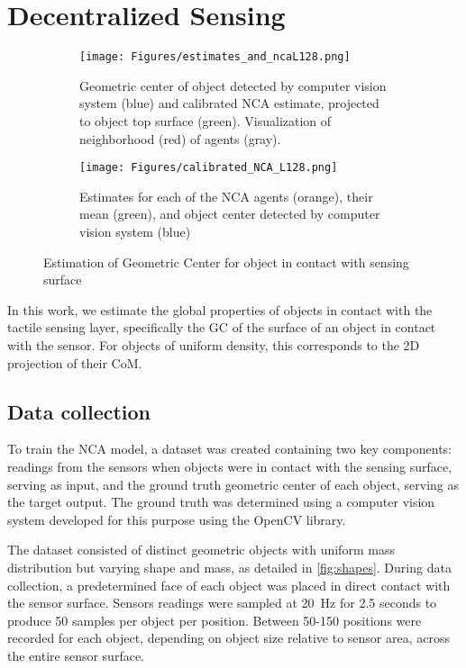 \section{Decentralized Sensing} %



\begin{figure*}[th]
\begin{subfigure}{0.5\textwidth}
\centering
\texttt{[image: Figures/estimates\_and\_ncaL128.png]}
\captionsetup{width=0.9\textwidth}
\caption{Geometric center of object detected by computer vision system (blue) and calibrated NCA estimate, projected to object top surface (green). Visualization of neighborhood (red) of agents (gray).}
\label{fig:estimate_projections}
\end{subfigure}
\begin{subfigure}{0.5\textwidth}
\centering
\texttt{[image: Figures/calibrated\_NCA\_L128.png]}
\captionsetup{width=0.9\textwidth}
\caption{Estimates for each of the NCA agents (orange), their mean (green), and object center detected by computer vision system (blue)\\
}
\label{fig:NCA_estimates}
\end{subfigure}

\caption{Estimation of Geometric Center for object in contact with sensing surface }
\label{fig:twin_image}
\end{figure*}

In this work, we estimate the global properties of objects in contact with the tactile sensing layer, specifically the \ac{GC} of the surface of an object in contact with the sensor. For objects of uniform density, this corresponds to the 2D projection of their \ac{CoM}.


\subsection{Data collection}

To train the \ac{NCA} model, a dataset was created containing two key components: readings from the sensors when objects were in contact with the sensing surface, serving as input, and the ground truth geometric center of each object, serving as the target output. The ground truth was determined using a computer vision system developed for this purpose using the OpenCV library\cite{bradski_opencv_2000}.


The dataset consisted of distinct geometric objects with uniform mass distribution but varying shape and mass, as detailed in \cref{fig:shapes}. During data collection, a predetermined face of each object was placed in direct contact with the sensor surface. Sensors readings were sampled at 20~Hz for 2.5 seconds to produce 50 samples per object per position. Between 50-150 positions were recorded for each object, depending on object size relative to sensor area,  across the entire sensor surface.

